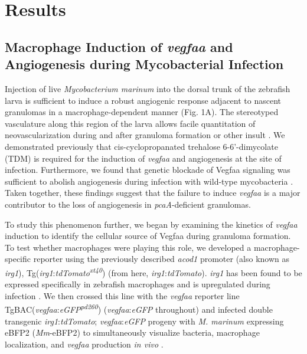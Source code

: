 \section{Results}

\subsection{Macrophage Induction of \textit{vegfaa} and Angiogenesis during Mycobacterial Infection}

Injection of live \textit{Mycobacterium marinum} into the dorsal trunk of the zebrafish larva is sufficient to induce a robust angiogenic response adjacent to nascent granulomas in a macrophage-dependent manner \citep{Oehlers2015} (Fig. 1A). The stereotyped vasculature along this region of the larva allows facile quantitation of neovascularization during and after granuloma formation or other insult \citep{Lawson2002, Jin2005, Gore2012, Matsuoka2018}. We demonstrated previously that cis-cyclopropanated trehalose 6-6'-dimycolate (TDM) is required for the induction of \textit{vegfaa} and angiogenesis at the site of infection. Furthermore, we found that genetic blockade of Vegfaa signaling was sufficient to abolish angiogenesis during infection with wild-type mycobacteria \citep{Walton2018}. Taken together, these findings suggest that the failure to induce \textit{vegfaa} is a major contributor to the loss of angiogenesis in \textit{pcaA}-deficient granulomas.

To study this phenomenon further, we began by examining the kinetics of \textit{vegfaa} induction to identify the cellular source of Vegfaa during granuloma formation. To test whether macrophages were playing this role, we developed a macrophage-specific reporter using the previously described \textit{acod1} promoter (also known as \textit{irg1}), Tg(\textit{irg1}:\textit{tdTomato\textsuperscript{xt40}}) (from here, \textit{irg1}:\textit{tdTomato}). \textit{irg1} has been found to be expressed specifically in zebrafish macrophages and is upregulated during infection \citep{Sanderson2015, Kwon2022}. We then crossed this line with the \textit{vegfaa} reporter line TgBAC(\textit{vegfaa}:\textit{eGFP\textsuperscript{pd260}}) (\textit{vegfaa}:\textit{eGFP} throughout) \citep{Karra2018} and infected double transgenic \textit{irg1}:\textit{tdTomato}; \textit{vegfaa}:\textit{eGFP} progeny with \textit{M. marinum} expressing eBFP2 (\textit{Mm}-eBFP2) to simultaneously visualize bacteria, macrophage localization, and \textit{vegfaa} production \textit{in vivo} \citep{Takaki2013}.

